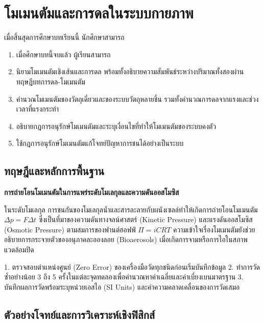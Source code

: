 \chapter{โมเมนตัมและการดลในระบบกายภาพ}
\label{ch:ch05_momentum_impulse}

\begin{conceptbox}[title=วัตถุประสงค์การเรียนรู้ประจำบท]
เมื่อสิ้นสุดการศึกษาบทเรียนนี้ นักศึกษาสามารถ
\begin{enumerate}
    \item เมื่อศึกษาบทนี้จบแล้ว ผู้เรียนสามารถ
    \item นิยามโมเมนตัมเชิงเส้นและการดล พร้อมทั้งอธิบายความสัมพันธ์ระหว่างปริมาณทั้งสองผ่านทฤษฎีบทการดล-โมเมนตัม
    \item คำนวณโมเมนตัมของวัตถุเดี่ยวและของระบบวัตถุหลายชิ้น รวมทั้งคำนวณการดลจากแรงและช่วงเวลาที่แรงกระทำ
    \item อธิบายกฎการอนุรักษ์โมเมนตัมและระบุเงื่อนไขที่ทำให้โมเมนตัมของระบบคงตัว
    \item ใช้กฎการอนุรักษ์โมเมนตัมแก้โจทย์ปัญหาการชนได้อย่างเป็นระบบ
\end{enumerate}
\end{conceptbox}

\section{ทฤษฎีและหลักการพื้นฐาน}

\begin{bioappbox}
\textbf{การถ่ายโอนโมเมนตัมในการแพร่ระดับโมเลกุลและความดันออสโมซิส}

ในระดับโมเลกุล การชนกันของโมเลกุลน้ำและสารละลายกับผนังเซลล์ทำให้เกิดการถ่ายโอนโมเมนตัม $\Delta p = F\Delta t$ ซึ่งเป็นที่มาของความดันทางจลน์ศาสตร์ (Kinetic Pressure) และแรงดันออสโมซิส (Osmotic Pressure) ตามสมการของฟานต์ฮอฟฟ์ $\Pi = iCRT$ ความเข้าใจเรื่องโมเมนตัมยังช่วยอธิบายการกระจายตัวของอนุภาคละอองลอย (Bioaerosols) เมื่อเกิดการจามหรือการไอในสภาพแวดล้อมปิด
\end{bioappbox}

\begin{labbox}
1. ตรวจสอบตำแหน่งศูนย์ (Zero Error) ของเครื่องมือวัดทุกชนิดก่อนเริ่มบันทึกข้อมูล
2. ทำการวัดซ้ำอย่างน้อย 3 ถึง 5 ครั้งในแต่ละจุดทดลองเพื่อคำนวณหาค่าเฉลี่ยและค่าเบี่ยงเบนมาตรฐาน
3. บันทึกผลการวัดพร้อมระบุหน่วยเอสไอ (SI Units) และค่าความคลาดเคลื่อนของการวัดเสมอ
\end{labbox}

\section{ตัวอย่างโจทย์และการวิเคราะห์เชิงฟิสิกส์}

